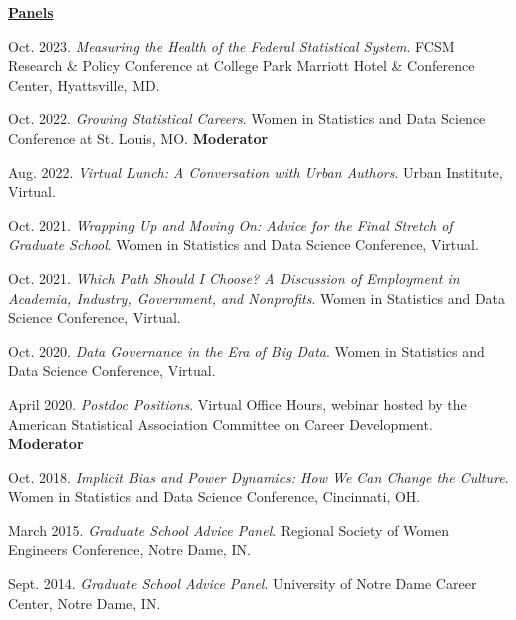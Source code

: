 \underline{\textbf{\large Panels}}\normalsize
\vspace{4pt}
\begin{etaremune}[topsep=0pt, itemsep=2.5pt, partopsep=0pt, parsep=0pt]
    \item Oct. 2023. \textit{Measuring the Health of the Federal Statistical System}. FCSM Research \& Policy Conference at College Park Marriott Hotel \& Conference Center, Hyattsville, MD.
    
    \item Oct. 2022. \textit{Growing Statistical Careers}. Women in Statistics and Data Science Conference at St. Louis, MO. \textbf{Moderator}
    
    \item Aug. 2022. \textit{Virtual Lunch: A Conversation with Urban Authors}. Urban Institute, Virtual.
    
    \item Oct. 2021. \textit{Wrapping Up and Moving On: Advice for the Final Stretch of Graduate School}. Women in Statistics and Data Science Conference, Virtual.
    
    \item Oct. 2021. \textit{Which Path Should I Choose? A Discussion of Employment in Academia, Industry, Government, and Nonprofits}. Women in Statistics and Data Science Conference, Virtual.
    
    \item Oct. 2020. \textit{Data Governance in the Era of Big Data}. Women in Statistics and Data Science Conference, Virtual.
    
    \item April 2020. \textit{Postdoc Positions}. Virtual Office Hours, webinar hosted by the American Statistical Association Committee on Career Development. \textbf{Moderator}
    
    \item Oct. 2018. \textit{Implicit Bias and Power Dynamics: How We Can Change the Culture}. Women in Statistics and Data Science Conference, Cincinnati, OH.

    \item March 2015. \textit{Graduate School Advice Panel}.  Regional Society of Women Engineers Conference, Notre Dame, IN.
    
    \item Sept. 2014. \textit{Graduate School Advice Panel}.  University of Notre Dame Career Center, Notre Dame, IN.
    

\end{etaremune}
